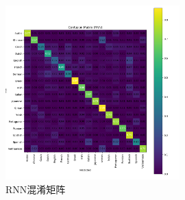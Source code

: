 \documentclass[a4paper]{article}
\begin{document}
\begin{figure}[H]
    \centering
    \includegraphics[width=0.6\textwidth]{confusion_matrix_rnn.png}
    \caption{RNN混淆矩阵}
    \label{fig:rnn_confusion}
\end{figure}
\end{document}
